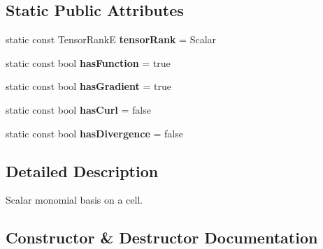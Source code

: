 \subsection*{Static Public Attributes}
\begin{DoxyCompactItemize}
\item 
\mbox{\label{classHArDCore2D_1_1MonomialScalarBasisCell_aa2e7be051d395b2467975540f83d2665}} 
static const Tensor\+RankE {\bfseries tensor\+Rank} = Scalar
\item 
\mbox{\label{classHArDCore2D_1_1MonomialScalarBasisCell_ac0f6b3726df8161c638761d398a4aa4e}} 
static const bool {\bfseries has\+Function} = true
\item 
\mbox{\label{classHArDCore2D_1_1MonomialScalarBasisCell_adb26517e60d4ab841e21ca4a71a9c685}} 
static const bool {\bfseries has\+Gradient} = true
\item 
\mbox{\label{classHArDCore2D_1_1MonomialScalarBasisCell_af1c39fee1ff92d9a2c6654dcff408b13}} 
static const bool {\bfseries has\+Curl} = false
\item 
\mbox{\label{classHArDCore2D_1_1MonomialScalarBasisCell_a188cf489655ee1dcbf4fcf52060d457c}} 
static const bool {\bfseries has\+Divergence} = false
\end{DoxyCompactItemize}


\subsection{Detailed Description}
Scalar monomial basis on a cell. 

\subsection{Constructor \& Destructor Documentation}
\mbox{\label{classHArDCore2D_1_1MonomialScalarBasisCell_a077d11dc2b2d74d11b72f165dc8d033a}} 
